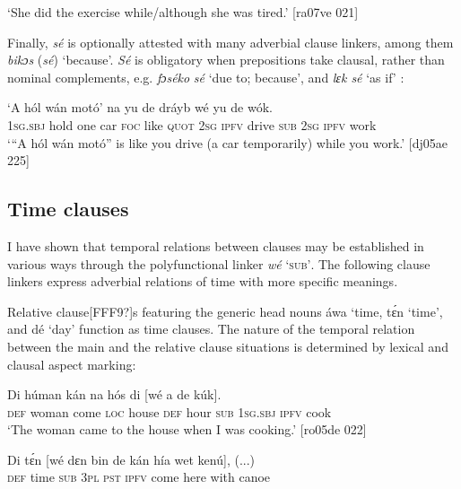 \glt ‘She did the exercise while/although she was tired.’ [ra07ve 021]
\z

Finally, \textit{sé} is optionally attested with many adverbial clause linkers, among them \textit{bikɔs} (\textit{sé}) ‘because’. \textit{Sé} is obligatory when prepositions take clausal, rather than nominal complements, e.g. \textit{fɔséko} \textit{sé} ‘due to; because’, and \textit{lɛk sé} ‘as if’ :


\ea%
    \label{ex:key:1471}
    \gll ‘A    hól    wán    motó’  na        yu  de  dráyb
wé  yu  de  wók.\\
\textsc{1sg.sbj}  hold    one    car    \textsc{foc}  like  \textsc{quot}    \textsc{2sg}  \textsc{ipfv}  drive
\textsc{sub}  \textsc{2sg}  \textsc{ipfv}  work\\

\glt ‘“A hól wán motó” is like you drive (a car temporarily) while you work.’ [dj05ae 225]
\z

\subsection{Time clauses}\label{sec:10.7.3}

I have shown that temporal relations between clauses may be established in various ways through the polyfunctional linker \textit{wé} ‘\textsc{sub’}. The following clause linkers express adverbial relations of time with more specific meanings. 


Relative clause[FFF9?]s featuring the generic head nouns áwa ‘time, tɛ́n ‘time’, and dé ‘day’ function as time clauses. The nature of the temporal relation between the main and the relative clause situations is determined by lexical and clausal aspect marking:



\ea%
    \label{ex:key:1472}
    \gll Di  húman  kán    na  hós    di      [wé  a    de  kúk].\\
\textsc{def}  woman  come  \textsc{loc}  house  \textsc{def}  hour   \textsc{sub}  \textsc{1sg.sbj}  \textsc{ipfv}  cook\\

\glt ‘The woman came to the house when I was cooking.’ [ro05de 022]
\z


\ea%
    \label{ex:key:1473}
    \gll Di  tɛ́n    [wé  dɛn  bin  de  kán    hía    wet    kenú],  (...)\\
\textsc{def}  time     \textsc{sub}  \textsc{3pl}  \textsc{pst}  \textsc{ipfv}  come  here    with    canoe\\

